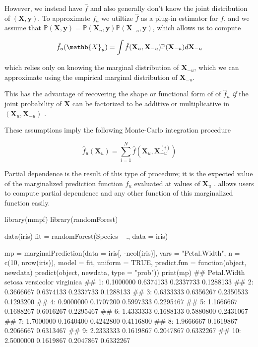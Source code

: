 However, we instead have $\hat{f}$ and also generally don't know the joint distribution of $(\mathbf{X}, \mathbf{y})$. To approximate $f_u$ we utiltize $\hat{f}$ as a plug-in estimator for $f$, and we assume that $\mathbb{P}(\mathbf{X}, \mathbf{y}) = \mathbb{P}(\mathbf{X}_{u}, \mathbf{y}) \mathbb{P}(\mathbf{X}_{-u}, \mathbf{y})$, which allows us to compute

$$\hat{f}_{u}(\mathb{X}_{u}) = \int \hat{f}(\mathbf{X}_{u}, \mathbf{X}_{-u}) \mathbb{P}(\mathbf{X}_{-u}) d \mathbf{X}_{-u}$$

which relies only on knowing the marginal distribution of $\mathbf{X}_{-u}$, which we can approximate using the empirical marginal distribution of $\mathbf{X}_{-u}$. 

This has the advantage of recovering the shape or functional form of of $\hat{f}_u$ \textit{if} the joint probability of $\mathbf{X}$ can be factorized to be additive or multiplicative in $(\mathbf{X}_u, \mathbf{X}_{-u})$ \citep{friedman2001greedy}.

These assumptions imply the following Monte-Carlo integration procedure

$$\hat{f}_u (\mathbf{X}_u) = \sum_{i = 1}^N \hat{f} (\mathbf{X}_u, \mathbf{X}_{-u}^{(i)})$$

Partial dependence is the result of this type of procedure; it is the expected value of the marginalized prediction function $\hat{f}_u$ evaluated at values of $\mathbf{X}_u$ \cite{friedman2001greedy}.  allows users to compute partial dependence and any other function of this marginalized function easily.

\begin{example}
  library(mmpf)
  library(randomForest)
  
  data(iris)
  fit = randomForest(Species ~ ., data = iris)

  mp = marginalPrediction(data = iris[, -ncol(iris)],
    vars = "Petal.Width",
    n = c(10, nrow(iris)), model = fit, uniform = TRUE,
    predict.fun = function(object, newdata) predict(object, newdata, type = "prob"))
  print(mp)
  ##     Petal.Width    setosa versicolor virginica
  ##  1:   0.1000000 0.6374133  0.2337733 0.1288133
  ##  2:   0.3666667 0.6374133  0.2337733 0.1288133
  ##  3:   0.6333333 0.6356267  0.2350533 0.1293200
  ##  4:   0.9000000 0.1707200  0.5997333 0.2295467
  ##  5:   1.1666667 0.1688267  0.6016267 0.2295467
  ##  6:   1.4333333 0.1688133  0.5880800 0.2431067
  ##  7:   1.7000000 0.1640400  0.4242800 0.4116800
  ##  8:   1.9666667 0.1619867  0.2066667 0.6313467
  ##  9:   2.2333333 0.1619867  0.2047867 0.6332267
  ## 10:   2.5000000 0.1619867  0.2047867 0.6332267
\end{example}

